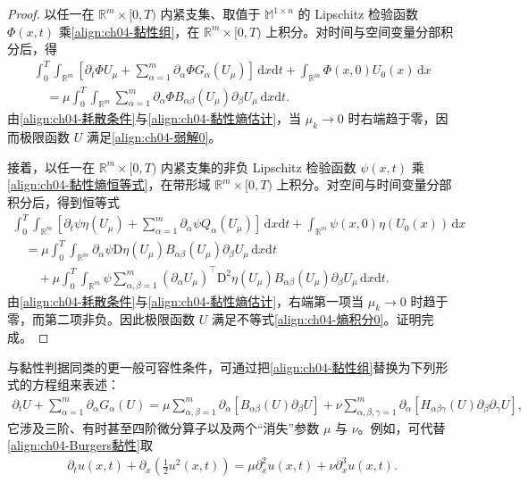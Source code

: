 \documentclass[../../main.tex]{subfiles}
\begin{document}
\begin{proof}
以任一在 $\mathbb{R}^{m}\times[0,T)$ 内紧支集、取值于 $\mathbb{M}^{1\times n}$ 的 Lipschitz 检验函数 $\Phi(x,t)$ 乘\eqref{align:ch04-黏性组}，在 $\mathbb{R}^{m}\times[0,T)$ 上积分。对时间与空间变量分部积分后，得
\begin{align}
\int_{0}^{T}\int_{\mathbb{R}^{m}}\left[\partial_{t}\Phi U_{\mu}+\sum_{\alpha=1}^{m}\partial_{\alpha}\Phi G_{\alpha}(U_{\mu})\right]\,\mathrm{d}x\mathrm{d}t+\int_{\mathbb{R}^{m}}\Phi(x,0)U_{0}(x)\,\mathrm{d}x\nonumber\\
\quad=\mu\int_{0}^{T}\int_{\mathbb{R}^{m}}\sum_{\alpha=1}^{m}\partial_{\alpha}\Phi B_{\alpha\beta}(U_{\mu})\partial_{\beta}U_{\mu}\,\mathrm{d}x\mathrm{d}t.
\label{align:ch04-黏性弱形式}
\end{align}
由\eqref{align:ch04-耗散条件}与\eqref{align:ch04-黏性熵估计}，当 $\mu_{k}\to 0$ 时右端趋于零，因而极限函数 $U$ 满足\eqref{align:ch04-弱解0}。

接着，以任一在 $\mathbb{R}^{m}\times[0,T)$ 内紧支集的非负 Lipschitz 检验函数 $\psi(x,t)$ 乘\eqref{align:ch04-黏性熵恒等式}，在带形域 $\mathbb{R}^{m}\times[0,T)$ 上积分。对空间与时间变量分部积分后，得到恒等式
\begin{align}
\int_{0}^{T}\int_{\mathbb{R}^{m}}\left[\partial_{t}\psi\eta(U_{\mu})+\sum_{\alpha=1}^{m}\partial_{\alpha}\psi Q_{\alpha}(U_{\mu})\right]\,\mathrm{d}x\mathrm{d}t+\int_{\mathbb{R}^{m}}\psi(x,0)\eta(U_{0}(x))\,\mathrm{d}x\nonumber\\
\quad=\mu\int_{0}^{T}\int_{\mathbb{R}^{m}}\partial_{\alpha}\psi\mathrm{D}\eta(U_{\mu})B_{\alpha\beta}(U_{\mu})\partial_{\beta}U_{\mu}\,\mathrm{d}x\mathrm{d}t\nonumber\\
\qquad+\mu\int_{0}^{T}\int_{\mathbb{R}^{m}}\psi\sum_{\alpha,\beta=1}^{m}(\partial_{\alpha}U_{\mu})^{\top}\mathrm{D}^{2}\eta(U_{\mu})B_{\alpha\beta}(U_{\mu})\partial_{\beta}U_{\mu}\,\mathrm{d}x\mathrm{d}t.
\label{align:ch04-黏性熵弱形式}
\end{align}
由\eqref{align:ch04-耗散条件}与\eqref{align:ch04-黏性熵估计}，右端第一项当 $\mu_{k}\to 0$ 时趋于零，而第二项非负。因此极限函数 $U$ 满足不等式\eqref{align:ch04-熵积分0}。证明完成。
\end{proof}

与黏性判据同类的更一般可容性条件，可通过把\eqref{align:ch04-黏性组}替换为下列形式的方程组来表述：
\begin{align}
\partial_{t}U+\sum_{\alpha=1}^{m}\partial_{\alpha}G_{\alpha}(U)=\mu\sum_{\alpha,\beta=1}^{m}\partial_{\alpha}[B_{\alpha\beta}(U)\partial_{\beta}U]+\nu\sum_{\alpha,\beta,\gamma=1}^{m}\partial_{\alpha}[H_{\alpha\beta\gamma}(U)\partial_{\beta}\partial_{\gamma}U],
\label{align:ch04-黏性色散组}
\end{align}
它涉及三阶、有时甚至四阶微分算子以及两个“消失”参数 $\mu$ 与 $\nu$。例如，可代替\eqref{align:ch04-Burgers黏性}取
\begin{align}
\partial_{t}u(x,t)+\partial_{x}\left(\tfrac{1}{2}u^{2}(x,t)\right)=\mu\partial_{x}^{2}u(x,t)+\nu\partial_{x}^{3}u(x,t).
\label{align:ch04-Burgers三阶}
\end{align}
\end{document}

